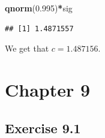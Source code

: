 \documentclass[]{krantz}
\makeatletter
\newenvironment{Shaded}{\begin{snugshade}}{\end{snugshade}}
\newcommand{\FloatTok}[1]{\textcolor[rgb]{0.00,0.00,0.81}{#1}}
\newcommand{\KeywordTok}[1]{\textcolor[rgb]{0.13,0.29,0.53}{\textbf{#1}}}
\newcommand{\NormalTok}[1]{#1}
\newcommand{\OperatorTok}[1]{\textcolor[rgb]{0.81,0.36,0.00}{\textbf{#1}}}
\newenvironment{kframe}{%
\medskip{}
\setlength{\fboxsep}{.8em}
 \def\at@end@of@kframe{}%
 \ifinner\ifhmode%
  \def\at@end@of@kframe{\end{minipage}}%
  \begin{minipage}{\columnwidth}%
 \fi\fi%
 \def\FrameCommand##1{\hskip\@totalleftmargin \hskip-\fboxsep
 \colorbox{shadecolor}{##1}\hskip-\fboxsep
     \hskip-\linewidth \hskip-\@totalleftmargin \hskip\columnwidth}%
 \MakeFramed {\advance\hsize-\width
   \@totalleftmargin\z@ \linewidth\hsize
   \@setminipage}}%
 {\par\unskip\endMakeFramed%
 \at@end@of@kframe}
\renewenvironment{Shaded}{\begin{kframe}}{\end{kframe}}
\theoremstyle{definition}
\theoremstyle{definition}
\theoremstyle{definition}
\theoremstyle{remark}
\makeatother
\begin{document}
\begin{enumerate}
\begin{Shaded}
\begin{Highlighting}[]
\KeywordTok{qnorm}\NormalTok{(}\FloatTok{0.995}\NormalTok{)}\OperatorTok{*}\NormalTok{sig}
\end{Highlighting}
\end{Shaded}

\begin{verbatim}
## [1] 1.4871557
\end{verbatim}

  We get that \(c=1.487156\).
\end{enumerate}

\hypertarget{chapter-9}{%
\section*{Chapter 9}\label{chapter-9}}


\hypertarget{exercise-9.1}{%
\subsection*{Exercise 9.1}\label{exercise-9.1}}
\end{document}
